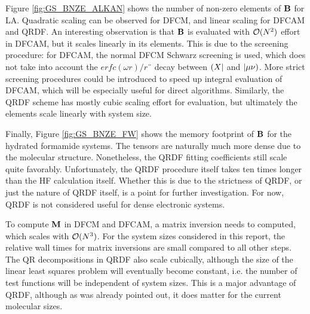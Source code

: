 Figure \ref{fig:GS_BNZE_ALKAN} shows the number of non-zero elements of $\mathbf{B}$ for LA. Quadratic scaling can be observed for DFCM, and linear scaling for DFCAM and QRDF. An interesting observation is that $\mathbf{B}$ is evaluated with $\mathcal{O}(N^{2})$ effort in DFCAM, but it scales linearly in its elements. This is due to the screening procedure: for DFCAM, the normal DFCM Schwarz screening is used, which does not take into account the $erfc(\omega r)/r$¨ decay between $\left( X \right\rvert$ and $\left\lvert \mu\nu \right)$. More strict screening procedures could be introduced to speed up integral evaluation of DFCAM, which will be especially useful for direct algorithms. Similarly, the QRDF scheme has mostly cubic scaling effort for evaluation, but ultimately the elements scale linearly with system size. 

Finally, Figure \ref{fig:GS_BNZE_FW} shows the memory footprint of $\mathbf{B}$ for the hydrated formamide systems. The tensors are naturally much more dense due to the molecular structure. Nonetheless, the QRDF fitting coefficients still scale quite favorably. Unfortunately, the QRDF procedure itself takes ten times longer than the HF calculation itself. Whether this is due to the strictness of QRDF, or just the nature of QRDF itself, is a point for further investigation. For now, QRDF is not considered useful for dense electronic systems. 

To compute $\mathbf{M}$ in DFCM and DFCAM, a matrix inversion needs to computed, which scales with $\mathcal{O}(N^{3})$. For the system sizes considered in this report, the relative wall times for matrix inversions are small compared to all other steps. The QR decompositions in QRDF also scale cubically, although the size of the linear least squares problem will eventually become constant, i.e. the number of test functions will be independent of system sizes. This is a major advantage of QRDF, although as was already pointed out, it does matter for the current molecular sizes.

